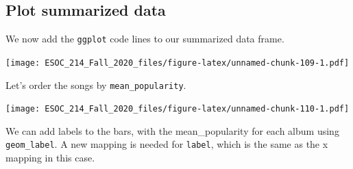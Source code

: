 \documentclass[
]{book}
\newenvironment{Shaded}{\begin{snugshade}}{\end{snugshade}}
\newcommand{\DataTypeTok}[1]{\textcolor[rgb]{0.13,0.29,0.53}{#1}}
\newcommand{\KeywordTok}[1]{\textcolor[rgb]{0.13,0.29,0.53}{\textbf{#1}}}
\newcommand{\NormalTok}[1]{#1}
\newcommand{\OperatorTok}[1]{\textcolor[rgb]{0.81,0.36,0.00}{\textbf{#1}}}
\newcommand{\StringTok}[1]{\textcolor[rgb]{0.31,0.60,0.02}{#1}}
\begin{document}
\hypertarget{plot-summarized-data}{%
\subsection{Plot summarized data}\label{plot-summarized-data}}

We now add the \texttt{ggplot} code lines to our summarized data frame.

\begin{Shaded}
\end{Shaded}

\texttt{[image: ESOC\_214\_Fall\_2020\_files/figure-latex/unnamed-chunk-109-1.pdf]}

Let's order the songs by \texttt{mean\_popularity}.

\begin{Shaded}
\end{Shaded}

\texttt{[image: ESOC\_214\_Fall\_2020\_files/figure-latex/unnamed-chunk-110-1.pdf]}

We can add labels to the bars, with the mean\_popularity for each album using \texttt{geom\_label}. A new mapping is needed for \texttt{label}, which is the same as the x mapping in this case.
\end{document}
